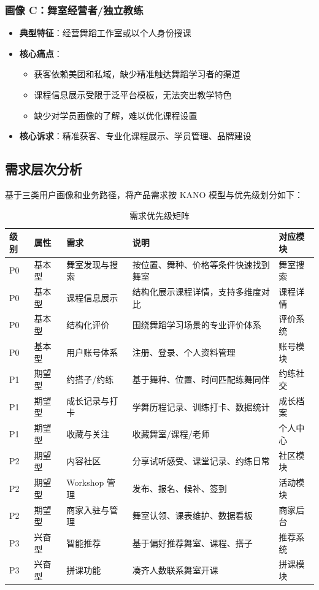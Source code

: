 \documentclass[12pt,a4paper]{ctexart}
\begin{document}
\subsubsection{画像 C：舞室经营者/独立教练}

\begin{itemize}
    \item \textbf{典型特征}：经营舞蹈工作室或以个人身份授课
    \item \textbf{核心痛点}：
    \begin{itemize}
        \item 获客依赖美团和私域，缺少精准触达舞蹈学习者的渠道
        \item 课程信息展示受限于泛平台模板，无法突出教学特色
        \item 缺少对学员画像的了解，难以优化课程设置
    \end{itemize}
    \item \textbf{核心诉求}：精准获客、专业化课程展示、学员管理、品牌建设
\end{itemize}

\subsection{需求层次分析}

基于三类用户画像和业务路径，将产品需求按 KANO 模型与优先级划分如下：

\begin{table}[H]
\centering
\caption{需求优先级矩阵}
\begin{tabularx}{\textwidth}{C{0.8cm}L{1.2cm}L{3cm}X L{2cm}}
\toprule
\textbf{级别} & \textbf{属性} & \textbf{需求} & \textbf{说明} & \textbf{对应模块} \\
\midrule
P0 & 基本型 & 舞室发现与搜索 & 按位置、舞种、价格等条件快速找到舞室 & 舞室搜索 \\
P0 & 基本型 & 课程信息展示 & 结构化展示课程详情，支持多维度对比 & 课程详情 \\
P0 & 基本型 & 结构化评价 & 围绕舞蹈学习场景的专业评价体系 & 评价系统 \\
P0 & 基本型 & 用户账号体系 & 注册、登录、个人资料管理 & 账号模块 \\
\midrule
P1 & 期望型 & 约搭子/约练 & 基于舞种、位置、时间匹配练舞同伴 & 约练社交 \\
P1 & 期望型 & 成长记录与打卡 & 学舞历程记录、训练打卡、数据统计 & 成长档案 \\
P1 & 期望型 & 收藏与关注 & 收藏舞室/课程/老师 & 个人中心 \\
\midrule
P2 & 期望型 & 内容社区 & 分享试听感受、课堂记录、约练日常 & 社区模块 \\
P2 & 期望型 & Workshop 管理 & 发布、报名、候补、签到 & 活动模块 \\
P2 & 期望型 & 商家入驻与管理 & 舞室认领、课表维护、数据看板 & 商家后台 \\
\midrule
P3 & 兴奋型 & 智能推荐 & 基于偏好推荐舞室、课程、搭子 & 推荐系统 \\
P3 & 兴奋型 & 拼课功能 & 凑齐人数联系舞室开课 & 拼课模块 \\
\bottomrule
\end{tabularx}
\end{table}
\end{document}
